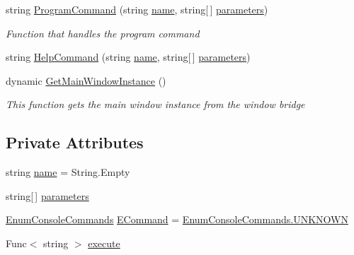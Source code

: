 \begin{DoxyCompactItemize}
string \hyperlink{class_c_p_u___o_s___simulator_1_1_console_1_1_console_command_a15069fc340cb27e5560c1dac008d1284}{Program\+Command} (string \hyperlink{class_c_p_u___o_s___simulator_1_1_console_1_1_console_command_a0ba819d58268ef4f9bab12089a9fd1a4}{name}, string\mbox{[}$\,$\mbox{]} \hyperlink{class_c_p_u___o_s___simulator_1_1_console_1_1_console_command_a00586d96461c740fd20069c604424c22}{parameters})
\begin{DoxyCompactList}\small\item\em Function that handles the program command \end{DoxyCompactList}\item 
string \hyperlink{class_c_p_u___o_s___simulator_1_1_console_1_1_console_command_a95e3a9c016db37795301ba7428b401ae}{Help\+Command} (string \hyperlink{class_c_p_u___o_s___simulator_1_1_console_1_1_console_command_a0ba819d58268ef4f9bab12089a9fd1a4}{name}, string\mbox{[}$\,$\mbox{]} \hyperlink{class_c_p_u___o_s___simulator_1_1_console_1_1_console_command_a00586d96461c740fd20069c604424c22}{parameters})
\item 
dynamic \hyperlink{class_c_p_u___o_s___simulator_1_1_console_1_1_console_command_a96ae53d2c2e970a6bb1479be0a66af72}{Get\+Main\+Window\+Instance} ()
\begin{DoxyCompactList}\small\item\em This function gets the main window instance from the window bridge \end{DoxyCompactList}\end{DoxyCompactItemize}
\subsection*{Private Attributes}
\begin{DoxyCompactItemize}
\item 
string \hyperlink{class_c_p_u___o_s___simulator_1_1_console_1_1_console_command_a0ba819d58268ef4f9bab12089a9fd1a4}{name} = String.\+Empty
\item 
string\mbox{[}$\,$\mbox{]} \hyperlink{class_c_p_u___o_s___simulator_1_1_console_1_1_console_command_a00586d96461c740fd20069c604424c22}{parameters}
\item 
\hyperlink{namespace_c_p_u___o_s___simulator_1_1_console_a5d9f2366d41d3eb074f056be426272d7}{Enum\+Console\+Commands} \hyperlink{class_c_p_u___o_s___simulator_1_1_console_1_1_console_command_a623b0c35b5b676fa1931c62dde508486}{E\+Command} = \hyperlink{namespace_c_p_u___o_s___simulator_1_1_console_a5d9f2366d41d3eb074f056be426272d7a696b031073e74bf2cb98e5ef201d4aa3}{Enum\+Console\+Commands.\+U\+N\+K\+N\+O\+W\+N}
\item 
Func$<$ string $>$ \hyperlink{class_c_p_u___o_s___simulator_1_1_console_1_1_console_command_a14965572ab7b76a453e1dd49d268b48a}{execute}
\end{DoxyCompactItemize}


